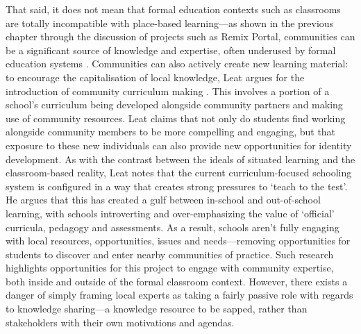 That said, it does not mean that formal education contexts such as classrooms are totally incompatible with place-based learning---as shown in the previous chapter through the discussion of projects such as Remix Portal, communities can be a significant source of knowledge and expertise, often underused by formal education systems \citep{Dodds2017}. Communities can also actively create new learning material: to encourage the capitalisation of local knowledge, Leat argues for the introduction of community curriculum making \citep{Leat2015}. This involves a portion of a school's curriculum being developed alongside community partners and making use of community resources. Leat claims that not only do students find working alongside community members to be more compelling and engaging, but that exposure to these new individuals can also provide new opportunities for identity development. As with the contrast between the ideals of situated learning and the classroom-based reality, Leat notes that the current curriculum-focused schooling system is configured in a way that creates strong pressures to `teach to the test'. He argues that this has created a gulf between in-school and out-of-school learning, with schools introverting and over-emphasizing the value of `official' curricula, pedagogy and assessments. As a result, schools aren't fully engaging with local resources, opportunities, issues and needs---removing opportunities for students to discover and enter nearby communities of practice. Such research highlights opportunities for this project to engage with community expertise, both inside and outside of the formal classroom context. However, there exists a danger of simply framing local experts as taking a fairly passive role with regards to knowledge sharing---a knowledge resource to be sapped, rather than stakeholders with their own motivations and agendas. 

